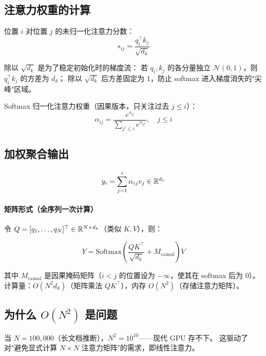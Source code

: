 \subsection*{注意力权重的计算}

位置 $i$ 对位置 $j$ 的未归一化注意力分数：
\begin{equation}
  s_{ij} = \frac{q_i^\top k_j}{\sqrt{d_k}}
  \label{eq:attn_score}
\end{equation}

\noindent
除以 $\sqrt{d_k}$ 是为了稳定初始化时的梯度流：
若 $q_i, k_j$ 的各分量独立 $\mathcal{N}(0,1)$，则 $q_i^\top k_j$ 的方差为 $d_k$；
除以 $\sqrt{d_k}$ 后方差固定为 1，防止 softmax 进入梯度消失的"尖峰"区域。

Softmax 归一化注意力权重（因果版本，只关注过去 $j \le i$）：
\begin{equation}
  \alpha_{ij} = \frac{e^{s_{ij}}}{\sum_{j' \le i} e^{s_{ij'}}}, \quad j \le i
  \label{eq:softmax}
\end{equation}

\subsection*{加权聚合输出}

\begin{equation}
  y_i = \sum_{j=1}^{i} \alpha_{ij} v_j \in \mathbb{R}^{d_v}
  \label{eq:attn_output}
\end{equation}

\paragraph{矩阵形式（全序列一次计算）}

令 $Q = [q_1, \ldots, q_N]^\top \in \mathbb{R}^{N \times d_k}$（类似 $K, V$），则：

\begin{equation}
  Y = \text{Softmax}\!\left(\frac{QK^\top}{\sqrt{d_k}} + M_\text{causal}\right) V
  \label{eq:attn_matrix}
\end{equation}

其中 $M_\text{causal}$ 是因果掩码矩阵（$i < j$ 的位置设为 $-\infty$，使其在 softmax 后为 0）。
计算量：$O(N^2 d_k)$（矩阵乘法 $QK^\top$），内存 $O(N^2)$（存储注意力矩阵）。

\subsection*{为什么 $O(N^2)$ 是问题}

当 $N = 100{,}000$（长文档推断），$N^2 = 10^{10}$——现代 GPU 存不下。
这驱动了对"避免显式计算 $N \times N$ 注意力矩阵"的需求，即线性注意力。

